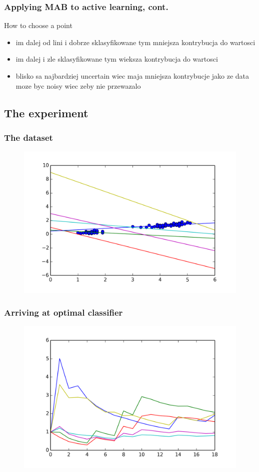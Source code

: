 \documentclass{beamer}
\begin{document}
  \begin{frame}
  \frametitle{Applying MAB to active learning, cont.}
  \begin{block}{How to choose a point}
    \begin{itemize}
      \item im dalej od lini i dobrze sklasyfikowane tym mniejsza kontrybucja do wartosci
      \item im dalej i zle sklasyfikowane tym wieksza kontrybucja do wartosci
      \item blisko sa najbardziej uncertain wiec maja mniejsza kontrybucje jako ze data moze byc noisy wiec zeby nie przewazalo
    \end{itemize}
  \end{block}
  \end{frame}


\subsection{The experiment}
  \begin{frame}
  \frametitle{The dataset}
    \begin{figure}
      \includegraphics[scale=.7]{graphics/gypothesis} 
    \end{figure}
  \end{frame}
  \begin{frame}
  \frametitle{Arriving at optimal classifier}
    \begin{figure}
      \includegraphics[scale=.7]{graphics/convergence15} 
    \end{figure}
  \end{frame}
\end{document}
